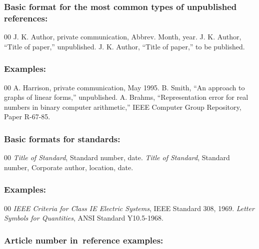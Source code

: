 \documentclass{ieeeojpel}
\begin{document}
\subsubsection*{Basic format for the most common types of unpublished references:}

\begin{thebibliography}{00}
 J. K. Author, private communication, Abbrev. Month, year.
 J. K. Author, ``Title of paper,'' unpublished.
 J. K. Author, ``Title of paper,'' to be published.
\end{thebibliography}

\subsubsection*{Examples:}

\begin{thebibliography}{00}
 A. Harrison, private communication, May 1995.
 B. Smith, ``An approach to graphs of linear forms,'' unpublished.
 A. Brahms, ``Representation error for real numbers in binary computer arithmetic,'' IEEE Computer Group Repository, Paper R-67-85.
\end{thebibliography}

\subsubsection*{Basic formats for standards:}

\begin{thebibliography}{00}
 \textit{Title of Standard}, Standard number, date.
 \textit{Title of Standard}, Standard number, Corporate author, location, date.
\end{thebibliography}

\subsubsection*{Examples:}

\begin{thebibliography}{00}
 \emph{IEEE Criteria for Class IE Electric Systems}, IEEE Standard 308, 1969.
 \emph{Letter Symbols for Quantities}, ANSI Standard Y10.5-1968.
\end{thebibliography}

\subsubsection*{Article number in~reference examples:}
\end{document}
